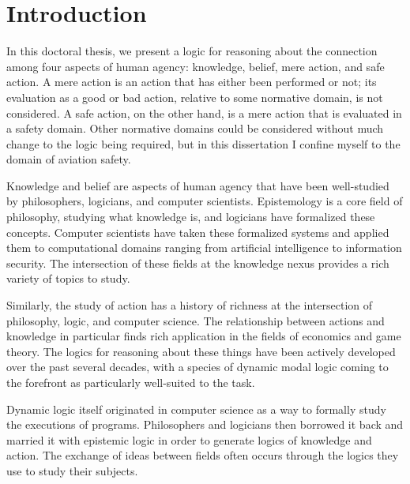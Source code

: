 \chapter{Introduction}
	\label{CH_Intro}

In this doctoral thesis, we present a logic for reasoning about the connection among four aspects of human agency: knowledge, belief, mere action, and safe action. A mere action is an action that has either been performed or not; its evaluation as a good or bad action, relative to some normative domain, is not considered. A safe action, on the other hand, is a mere action that is evaluated in a safety domain. Other normative domains could be considered without much change to the logic being required, but in this dissertation I confine myself to the domain of aviation safety.

Knowledge and belief are aspects of human agency that have been well-studied by philosophers, logicians, and computer scientists. Epistemology is a core field of philosophy, studying what knowledge is, and logicians have formalized these concepts. Computer scientists have taken these formalized systems and applied them to computational domains ranging from artificial intelligence to information security. The intersection of these fields at the knowledge nexus provides a rich variety of topics to study.

Similarly, the study of action has a history of richness at the intersection of philosophy, logic, and computer science. The relationship between actions and knowledge in particular finds rich application in the fields of economics and game theory. The logics for reasoning about these things have been actively developed over the past several decades, with a species of dynamic modal logic coming to the forefront as particularly well-suited to the task. 

Dynamic logic itself originated in computer science as a way to formally study the executions of programs. Philosophers and logicians then borrowed it back and married it with epistemic logic in order to generate logics of knowledge and action. The exchange of ideas between fields often occurs through the logics they use to study their subjects.

